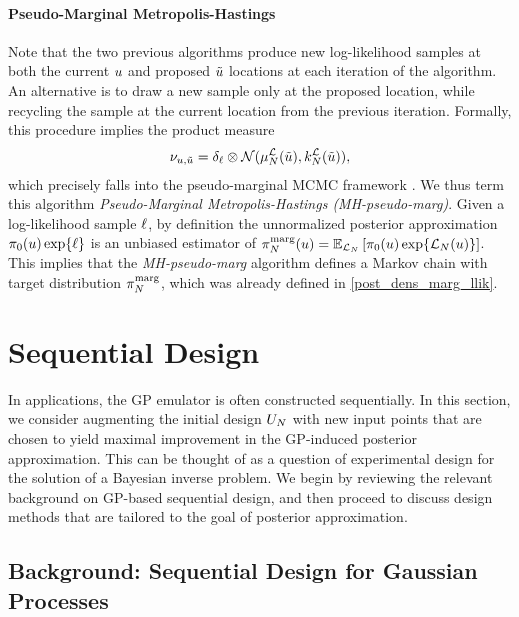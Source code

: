 \documentclass[12pt]{article}
\begin{document}
\paragraph{Pseudo-Marginal Metropolis-Hastings}
Note that the two previous algorithms produce new log-likelihood samples at both the current $\Par$ and proposed 
$\propPar$ locations at each iteration of the algorithm. An alternative is to draw a new sample only at the 
proposed location, while recycling the sample at the current location from the previous iteration. Formally, this procedure
implies the product measure 
\begin{align}
\llikSampDist_{\Par, \propPar} 
= \delta_{\llikSamp} \otimes  
\Gaussian(\emMean[\Ndesign]{\llik}(\propPar), \emKer[\Ndesign]{\llik}(\propPar)), \label{llik_dist_pseudo_marg}
\end{align}
which precisely falls into the pseudo-marginal MCMC framework \cite{pseudoMarginalMCMC}. We thus term 
this algorithm \textit{Pseudo-Marginal Metropolis-Hastings (MH-pseudo-marg)}. Given a log-likelihood sample 
$\llikSamp$, by definition the unnormalized posterior approximation $\priorDens(\Par) \Exp{\llikSamp}$ is 
an unbiased estimator of 
$\llikEmMargDens[\Ndesign](\Par) = \E_{\llikEm[\Ndesign]}\left[\priorDens(\Par) \Exp{\llikEm[\Ndesign](\Par)} \right]$. 
This implies that the \textit{MH-pseudo-marg} algorithm defines a Markov chain with target distribution 
$\llikEmMargDens[\Ndesign]$, which was already defined in \ref{post_dens_marg_llik}. 


\section{Sequential Design}
In applications, the GP emulator is often constructed sequentially. In this section, we consider augmenting the 
initial design $\designIn[\Ndesign]$ with new input points that are chosen to yield maximal improvement in the 
GP-induced posterior approximation. This can be thought of as a question of experimental design for the 
solution of a Bayesian inverse problem. We begin by reviewing the relevant background on GP-based 
sequential design, and then proceed to discuss design methods that are tailored to the goal of 
posterior approximation.  

\subsection{Background: Sequential Design for Gaussian Processes}
\end{document}
